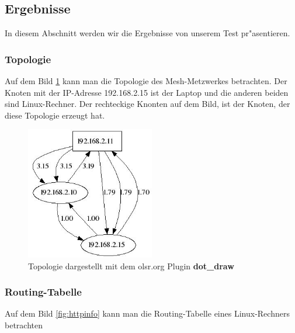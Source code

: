 \subsection{Ergebnisse}

In diesem Abschnitt werden wir die Ergebnisse von unserem Test pr"asentieren.

\subsubsection{Topologie}

Auf dem Bild \ref{fig:Topology} kann man die Topologie des Mesh-Metzwerkes
betrachten. Der Knoten mit der IP-Adresse 192.168.2.15 ist der Laptop und
die anderen beiden sind Linux-Rechner. Der rechteckige Knonten auf dem Bild, ist
der Knoten, der diese Topologie erzeugt hat.

\begin{figure}[H]
\centering
\includegraphics[width=0.5\textwidth]{images/Topology.jpg}
\caption{Topologie dargestellt mit dem olsr.org Plugin \textbf{dot\_draw}}
\label{fig:Topology}
\end{figure}


\subsubsection{Routing-Tabelle}

Auf dem Bild \ref{fig:httpinfo} kann man die Routing-Tabelle
eines Linux-Rechners betrachten

